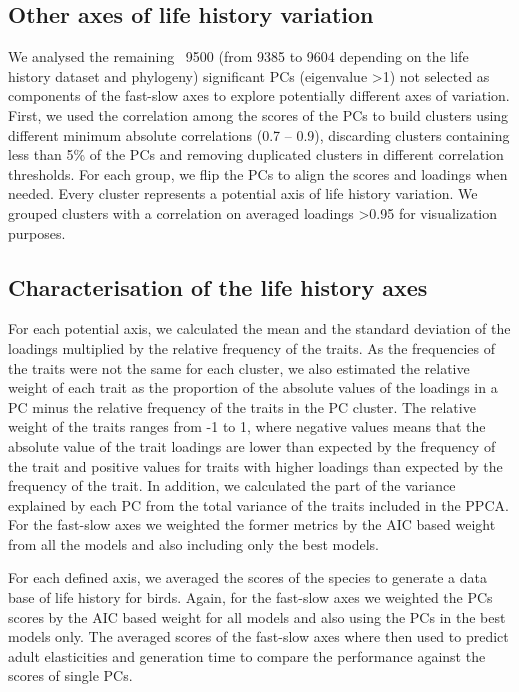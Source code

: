 \subsection*{Other axes of life history variation}

We analysed the remaining ~9500 (from 9385 to 9604 depending on the life 
history dataset and phylogeny) significant PCs (eigenvalue \textgreater{1}) not 
selected as components of the fast-slow axes to explore potentially different
axes of variation. First, we used the correlation among the scores of the PCs to
build clusters using different minimum absolute correlations (0.7 – 0.9),
discarding clusters containing less than 5\% of the PCs and removing duplicated
clusters in different correlation thresholds.
For each group, we flip the PCs to align the scores and loadings when needed. 
Every cluster represents a potential axis of life history variation. We grouped 
clusters with a correlation on averaged loadings \textgreater{0.95} for 
visualization purposes.


\subsection*{Characterisation of the life history axes}

For each potential axis, we calculated the mean and the standard deviation of 
the loadings multiplied by the relative frequency of the traits. As the 
frequencies of the traits were not the same for each cluster, we also estimated 
the relative weight of each trait as the proportion of the absolute values of 
the loadings in a PC minus the relative frequency of the traits in the PC 
cluster. The relative weight of the traits ranges from -1 to 1, where negative 
values means that the absolute value of the trait loadings are lower than 
expected by the frequency of the trait and positive values for traits with 
higher loadings than expected by the frequency of the trait. In addition, we 
calculated the part of the variance explained by each PC from the total variance 
of the traits included in the PPCA.
For the fast-slow axes we weighted the former metrics by the AIC based weight
from all the models and also including only the best models.

For each defined axis, we averaged the scores of the species to generate a data 
base of life history for birds. Again, for the fast-slow axes we weighted the
PCs scores by the AIC based weight for all models and also using the PCs in the
best models only. The averaged scores of the fast-slow axes where then used to
predict adult elasticities and generation time to compare the performance
against the scores of single PCs.


